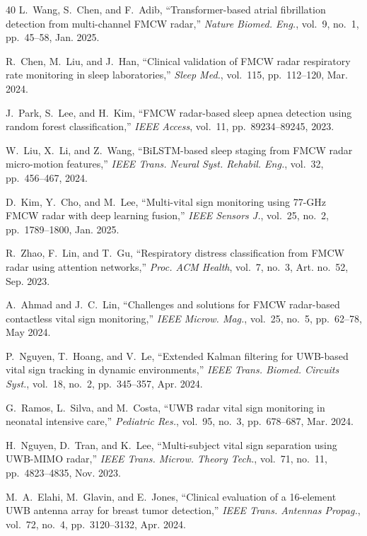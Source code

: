 \documentclass[journal,twoside]{IEEEtran}
\begin{document}
\begin{thebibliography}{40}
L.~Wang, S.~Chen, and F.~Adib, ``Transformer-based atrial fibrillation detection from multi-channel FMCW radar,'' \textit{Nature Biomed. Eng.}, vol.~9, no.~1, pp.~45--58, Jan. 2025.

R.~Chen, M.~Liu, and J.~Han, ``Clinical validation of FMCW radar respiratory rate monitoring in sleep laboratories,'' \textit{Sleep Med.}, vol.~115, pp.~112--120, Mar. 2024.

J.~Park, S.~Lee, and H.~Kim, ``FMCW radar-based sleep apnea detection using random forest classification,'' \textit{IEEE Access}, vol.~11, pp.~89234--89245, 2023.

W.~Liu, X.~Li, and Z.~Wang, ``BiLSTM-based sleep staging from FMCW radar micro-motion features,'' \textit{IEEE Trans. Neural Syst. Rehabil. Eng.}, vol.~32, pp.~456--467, 2024.

D.~Kim, Y.~Cho, and M.~Lee, ``Multi-vital sign monitoring using 77-GHz FMCW radar with deep learning fusion,'' \textit{IEEE Sensors J.}, vol.~25, no.~2, pp.~1789--1800, Jan. 2025.

R.~Zhao, F.~Lin, and T.~Gu, ``Respiratory distress classification from FMCW radar using attention networks,'' \textit{Proc. ACM Health}, vol.~7, no.~3, Art. no.~52, Sep. 2023.

A.~Ahmad and J.~C.~Lin, ``Challenges and solutions for FMCW radar-based contactless vital sign monitoring,'' \textit{IEEE Microw. Mag.}, vol.~25, no.~5, pp.~62--78, May 2024.

P.~Nguyen, T.~Hoang, and V.~Le, ``Extended Kalman filtering for UWB-based vital sign tracking in dynamic environments,'' \textit{IEEE Trans. Biomed. Circuits Syst.}, vol.~18, no.~2, pp.~345--357, Apr. 2024.

G.~Ramos, L.~Silva, and M.~Costa, ``UWB radar vital sign monitoring in neonatal intensive care,'' \textit{Pediatric Res.}, vol.~95, no.~3, pp.~678--687, Mar. 2024.

H.~Nguyen, D.~Tran, and K.~Lee, ``Multi-subject vital sign separation using UWB-MIMO radar,'' \textit{IEEE Trans. Microw. Theory Tech.}, vol.~71, no.~11, pp.~4823--4835, Nov. 2023.

M.~A.~Elahi, M.~Glavin, and E.~Jones, ``Clinical evaluation of a 16-element UWB antenna array for breast tumor detection,'' \textit{IEEE Trans. Antennas Propag.}, vol.~72, no.~4, pp.~3120--3132, Apr. 2024.


\end{thebibliography}
\end{document}
